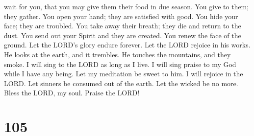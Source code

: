 wait for you, that you may give them their food in due season.
 You give to them; they gather. You open your hand; they
are satisfied with good.  You hide your face; they are
troubled. You take away their breath; they die and return to the dust.
 You send out your Spirit and they are created. You renew
the face of the ground.  Let the LORD's glory endure
forever. Let the LORD rejoice in his works.  He looks at
the earth, and it trembles. He touches the mountains, and they smoke.
 I will sing to the LORD as long as I live. I will sing
praise to my God while I have any being.  Let my meditation
be sweet to him. I will rejoice in the LORD.  Let sinners
be consumed out of the earth. Let the wicked be no more. Bless the LORD,
my soul. Praise the LORD!

\hypertarget{section-97}{%
\section{105}\label{section-97}}

